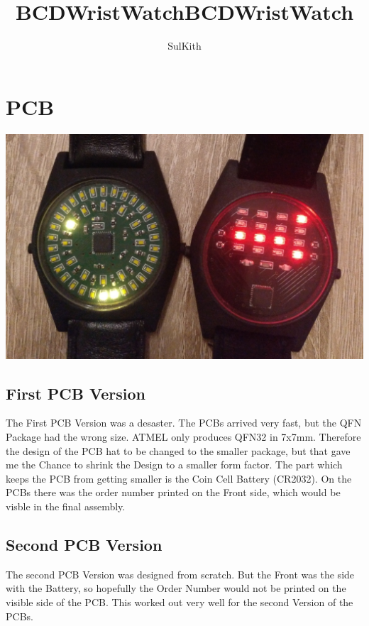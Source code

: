 \documentclass[12pt,a4paper,final]{article}
\title{BCDWristWatch}
\date{\vspace{-10ex}}
\begin{document}
\title{BCDWristWatch}
\author{SulKith}
\maketitle

\section{PCB}
\begin{center}
  \includegraphics[width=\textwidth]{../Pictures/AnalogClock.jpg}
\end{center}


\subsection{First PCB Version}
The First PCB Version was a desaster. The PCBs arrived very fast, but the QFN Package had the wrong size.
ATMEL only produces QFN32 in 7x7mm. Therefore the design of the PCB hat to be changed to the smaller package,
but that gave me the Chance to shrink the Design to a smaller form factor.
The part which keeps the PCB from getting smaller is the Coin Cell Battery (CR2032).
On the PCBs there was the order number printed on the Front side, which would be visble in the final assembly.
\subsection{Second PCB Version}

The second PCB Version was designed from scratch. But the Front was the side with the Battery, so hopefully the Order Number would not be printed on the visible side of the PCB. This worked out very well for the second Version of the PCBs.
\end{document}
